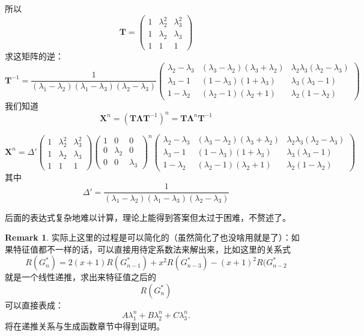 \documentclass[oneside]{book}
\theoremstyle{definition}
\newtheorem{remark}{Remark}[section]
\begin{document}
所以
\[\mathbf{T}=\begin{pmatrix}
	1  & \lambda_2^2 & \lambda_3^2 \\
	1 & \lambda_2 & \lambda_3 \\
	1 & 1 & 1
\end{pmatrix}\]
求这矩阵的逆：
\[\boldsymbol{T}^{-1} = \frac{1}{(\lambda_1 - \lambda_2)(\lambda_1 - \lambda_3)(\lambda_2 - \lambda_3)}
\begin{pmatrix}
	\lambda_2 - \lambda_3 & (\lambda_3 - \lambda_2)(\lambda_3 + \lambda_2) & \lambda_2\lambda_3(\lambda_2 - \lambda_3) \\
	\lambda_3 - 1 & (1 - \lambda_3)(1 + \lambda_3) & \lambda_3(\lambda_3 - 1) \\
	1 - \lambda_2 & (\lambda_2 - 1)(\lambda_2 + 1) & \lambda_2(1 - \lambda_2)
\end{pmatrix}
\]
我们知道
\[
\mathbf{X}^n=(\mathbf{T}\mathbf{\Lambda}\mathbf{T}^{-1})^n=\mathbf{T}\mathbf{\Lambda}^n\mathbf{T}^{-1}
\]

\[\mathbf{X}^n=\Delta'\begin{pmatrix}
	1  & \lambda_2^2 & \lambda_3^2 \\
	1 & \lambda_2 & \lambda_3 \\
	1 & 1 & 1
\end{pmatrix}\begin{pmatrix}
1  & 0 & 0 \\
0 & \lambda_2 & 0 \\
0 & 0 & \lambda_3
\end{pmatrix}^n\begin{pmatrix}
\lambda_2 - \lambda_3 & (\lambda_3 - \lambda_2)(\lambda_3 + \lambda_2) & \lambda_2\lambda_3(\lambda_2 - \lambda_3) \\
\lambda_3 - 1 & (1 - \lambda_3)(1 + \lambda_3) & \lambda_3(\lambda_3 - 1) \\
1 - \lambda_2 & (\lambda_2 - 1)(\lambda_2 + 1) & \lambda_2(1 - \lambda_2)
\end{pmatrix}
\]
其中 \[ \Delta'=\frac{1}{(\lambda_1 - \lambda_2)(\lambda_1 - \lambda_3)(\lambda_2 - \lambda_3)}\]

后面的表达式复杂地难以计算，理论上能得到答案但太过于困难，不赘述了。

\begin{remark}
	实际上这里的过程是可以简化的（虽然简化了也没啥用就是了）：如果特征值都不一样的话，可以直接用待定系数法来解出来，比如这里的关系式
	\[R(G_n^*)= 2(x+1)R(G_{n-1}^*) + x^2 R(G_{n-3}^*) - (x+1)^2R(G_{n-2}^*\]
	就是一个线性递推，求出来特征值之后的
	\[R(G_n^*)\]
	可以直接表成：
	\[A\lambda_1^n+B\lambda_2^n+C\lambda_3^n.\]
	将在递推关系与生成函数章节中得到证明。
\end{remark}
\end{document}

